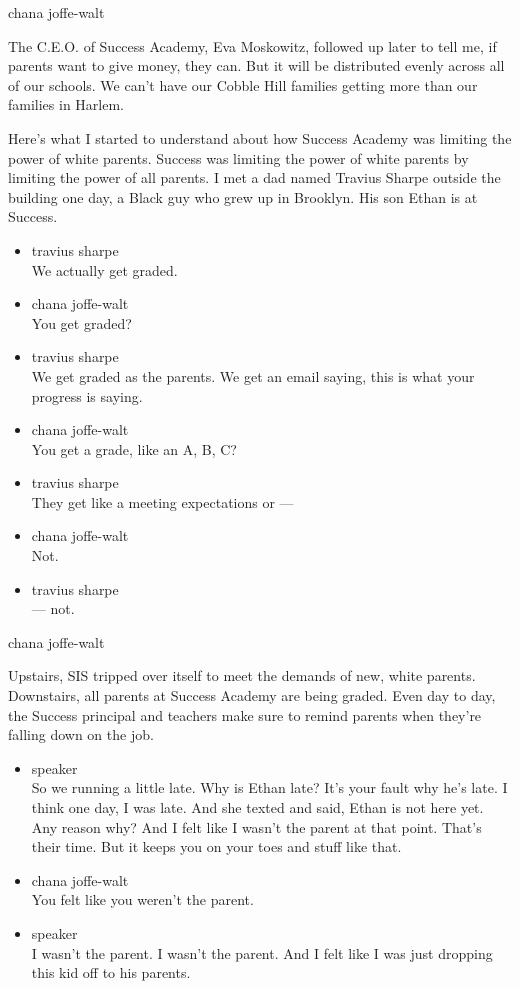 chana joffe-walt

The C.E.O. of Success Academy, Eva Moskowitz, followed up later to tell
me, if parents want to give money, they can. But it will be distributed
evenly across all of our schools. We can't have our Cobble Hill families
getting more than our families in Harlem.

Here's what I started to understand about how Success Academy was
limiting the power of white parents. Success was limiting the power of
white parents by limiting the power of all parents. I met a dad named
Travius Sharpe outside the building one day, a Black guy who grew up in
Brooklyn. His son Ethan is at Success.

\begin{itemize}
\item
  travius sharpe\\
  We actually get graded.
\item
  chana joffe-walt\\
  You get graded?
\item
  travius sharpe\\
  We get graded as the parents. We get an email saying, this is what
  your progress is saying.
\item
  chana joffe-walt\\
  You get a grade, like an A, B, C?
\item
  travius sharpe\\
  They get like a meeting expectations or ---
\item
  chana joffe-walt\\
  Not.
\item
  travius sharpe\\
  --- not.
\end{itemize}

chana joffe-walt

Upstairs, SIS tripped over itself to meet the demands of new, white
parents. Downstairs, all parents at Success Academy are being graded.
Even day to day, the Success principal and teachers make sure to remind
parents when they're falling down on the job.

\begin{itemize}
\item
  speaker\\
  So we running a little late. Why is Ethan late? It's your fault why
  he's late. I think one day, I was late. And she texted and said, Ethan
  is not here yet. Any reason why? And I felt like I wasn't the parent
  at that point. That's their time. But it keeps you on your toes and
  stuff like that.
\item
  chana joffe-walt\\
  You felt like you weren't the parent.
\item
  speaker\\
  I wasn't the parent. I wasn't the parent. And I felt like I was just
  dropping this kid off to his parents.
\end{itemize}

